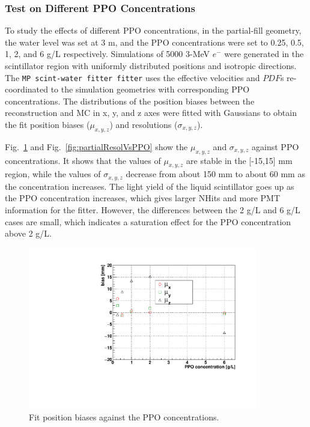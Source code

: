 \subsubsection{Test on Different PPO Concentrations}\label{sect:ppoConcentration}
To study the effects of different PPO concentrations, in the partial-fill geometry, the water level was set at 3 m, and the PPO concentrations were set to 0.25, 0.5, 1, 2, and 6 g/L respectively. Simulations of 5000 3-MeV $e^-$ were generated in the scintillator region with uniformly distributed positions and isotropic directions. The \texttt{MP scint-water fitter fitter} uses the effective velocities and $PDF$s re-coordinated to the simulation geometries with corresponding PPO concentrations. The distributions of the position biases between the reconstruction and MC in x, y, and z axes were fitted with Gaussians to obtain the fit position biases ($\mu_{x,y,z}$) and resolutions ($\sigma_{x,y,z}$).

Fig.~\ref{fig:partialBiasVsPPO} and Fig.~\ref{fig:partialResolVsPPO} show the $\mu_{x,y,z}$ and $\sigma_{x,y,z}$ against PPO concentrations. It shows that the values of $\mu_{x,y,z}$ are stable in the [-15,15] mm region, while the values of $\sigma_{x,y,z}$ decrease from about 150 mm to about 60 mm as the concentration increases. The light yield of the liquid scintillator goes up as the PPO concentration increases, which gives larger NHits and more PMT information for the fitter. However, the differences between the 2 g/L and 6 g/L cases are small, which indicates a saturation effect for the PPO concentration above 2 g/L.

\begin{figure}[!htb]
	\centering
	\includegraphics[width=10cm]{partialBiasVsPPO.pdf}
	\caption{Fit position biases against the PPO concentrations.}
	\label{fig:partialBiasVsPPO}
\end{figure}

